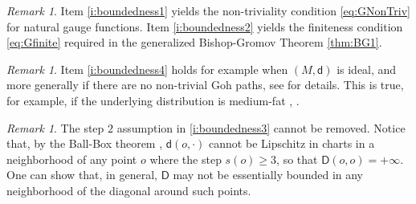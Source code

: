 \documentclass[11pt,a4paper]{article}
\theoremstyle{plain}
\theoremstyle{definition}
\theoremstyle{remark}
\newtheorem{remark}[theorem]{Remark}
\numberwithin{equation}{section}
\newcommand{\sfd}{\mathsf d}
\newcommand{\sfD}{\mathsf D}
\begin{document}
\begin{remark}
Item \ref{i:boundedness1} yields the non-triviality condition \eqref{eq:GNonTriv} for natural gauge functions. Item \ref{i:boundedness2} yields the finiteness condition \eqref{eq:Gfinite} required in the generalized Bishop-Gromov Theorem \ref{thm:BG1}.
\end{remark}
\begin{remark}\label{rmk:Goh}
Item \ref{i:boundedness4} holds for example when $(M,\sfd)$ is ideal, and more generally if there are no non-trivial Goh paths, see \cite[Thm.\@ 5.5]{AAPL-transport} for details. This is true, for example, if the underlying distribution is medium-fat \cite[Sec.\ 4.5]{FR-mass}, \cite{AS-minimalityVSsubanalyticity}.
\end{remark}
\begin{remark}
The step $2$ assumption in \ref{i:boundedness3} cannot be removed. Notice that, by the Ball-Box theorem \cite{Jeanbook,Bellaiche}, $\sfd(o,\cdot)$ cannot be Lipschitz in charts in a neighborhood of any point $o$ where the step $s(o)\geq 3$, so that $\sfD(o,o)=+\infty$. One can show that, in general, $\sfD$ may not be essentially bounded in any neighborhood of the diagonal around such points.


\end{remark}
\end{document}
